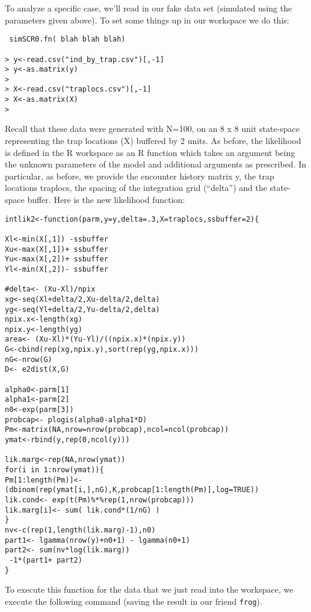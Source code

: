 To analyze a specific case, we’ll read in our fake data set (simulated
using the parameters given above). To set some things up in our
workspace we do this:

\begin{verbatim}
 simSCR0.fn( blah blah blah) 

> y<-read.csv("ind_by_trap.csv")[,-1]
> y<-as.matrix(y)
> 
> X<-read.csv("traplocs.csv")[,-1]
> X<-as.matrix(X)
> 

\end{verbatim}

Recall that these data were generated with N=100, on an 8 x 8 unit
state-space representing the trap locations (X) buffered by 2 units.
As before, the likelihood is defined in the R workspace as an R
function which takes an argument being the unknown parameters of the
model and additional arguments as prescribed. In particular, as
before, we provide the encounter history matrix y, the trap locations
traplocs, the spacing of the integration grid (“delta”) and the
state-space buffer. Here is the new likelihood function:

\begin{verbatim}
intlik2<-function(parm,y=y,delta=.3,X=traplocs,ssbuffer=2){

Xl<-min(X[,1]) -ssbuffer
Xu<-max(X[,1])+ ssbuffer
Yu<-max(X[,2])+ ssbuffer
Yl<-min(X[,2])- ssbuffer

#delta<- (Xu-Xl)/npix
xg<-seq(Xl+delta/2,Xu-delta/2,delta) 
yg<-seq(Yl+delta/2,Yu-delta/2,delta) 
npix.x<-length(xg)
npix.y<-length(yg)
area<- (Xu-Xl)*(Yu-Yl)/((npix.x)*(npix.y))
G<-cbind(rep(xg,npix.y),sort(rep(yg,npix.x)))
nG<-nrow(G)
D<- e2dist(X,G) 

alpha0<-parm[1]
alpha1<-parm[2]
n0<-exp(parm[3])
probcap<- plogis(alpha0-alpha1*D)
Pm<-matrix(NA,nrow=nrow(probcap),ncol=ncol(probcap))
ymat<-rbind(y,rep(0,ncol(y)))

lik.marg<-rep(NA,nrow(ymat))
for(i in 1:nrow(ymat)){
Pm[1:length(Pm)]<- (dbinom(rep(ymat[i,],nG),K,probcap[1:length(Pm)],log=TRUE))
lik.cond<- exp(t(Pm)%*%rep(1,nrow(probcap)))
lik.marg[i]<- sum( lik.cond*(1/nG) )  
}                                                 
nv<-c(rep(1,length(lik.marg)-1),n0)
part1<- lgamma(nrow(y)+n0+1) - lgamma(n0+1)
part2<- sum(nv*log(lik.marg))
 -1*(part1+ part2)
}
\end{verbatim}

To execute this function for the data that we just read into the
workspace, we execute the following command (saving the result in our
friend \mbox{\tt frog}).

